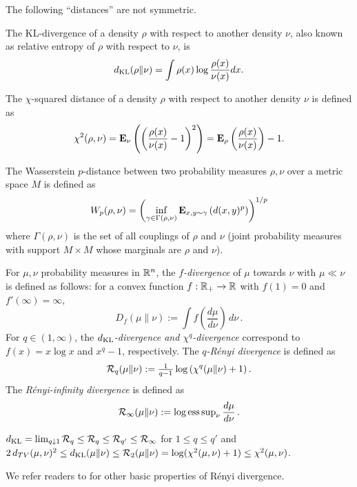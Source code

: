 The following ``distances'' are not symmetric.
\begin{defn}
\label{defn:KL-divergence}The KL-divergence of a density $\rho$
with respect to another density $\nu$, also known as relative entropy
of $\rho$ with respect to $\nu$, is 
\[
d_{\mathrm{KL}}(\rho\|\nu)=\int\rho(x)\log\frac{\rho(x)}{\nu(x)}dx.
\]
\end{defn}

\begin{defn}
The $\chi$-squared distance of a density $\rho$ with respect to
another density $\nu$ is defined as  
\[
\chi^{2}(\rho,\nu)=\mathbf{E}_{\nu}\left(\left(\frac{\rho(x)}{\nu(x)}-1\right)^{2}\right)=\mathbf{E}_{\rho}\left(\frac{\rho(x)}{\nu(x)}\right)-1.
\]
\end{defn}

\begin{defn}
\label{defn:The-Wasserstein--distance}The Wasserstein $p$-distance
between two probability measures $\rho,\nu$ over a metric space $M$
is defined as 
\[
W_{p}(\rho,\nu)=\left(\inf_{\gamma\in\Gamma(\rho,\nu)}\mathbf{E}_{x,y\sim\gamma}\left(d(x,y)^{p}\right)\right)^{1/p}
\]
where $\Gamma(\rho,\nu)$ is the set of all couplings of $\rho$ and
$\nu$ (joint probability measures with support $M\times M$ whose
marginals are $\rho$ and $\nu$).
\end{defn}

\begin{defn}
\label{def:p-dist} For $\mu,\nu$ probability measures in $\mathbb{R}^{n}$,
the \emph{$f$-divergence} of $\mu$ towards $\nu$ with $\mu\ll\nu$
is defined as follows: for a convex function $f:\mathbb{R}_{+}\to\mathbb{R}$ with
$f(1)=0$ and $f'(\infty)=\infty$, 
\[
D_{f}(\mu\|\nu):=\int f\left(\frac{d\mu}{d\nu}\right)\,d\nu\,.
\]
For $q\in(1,\infty)$, the \emph{$d_{\mathrm{KL}}$-divergence and $\chi^{q}$-divergence}
correspond to $f(x)=x\log x$ and $x^{q}-1$, respectively. The \emph{$q$-R\'enyi
divergence} is defined as 
\[
\mathbb{{\cal R}}_{q}(\mu\|\nu):=\tfrac{1}{q-1}\log\left(\chi^{q}(\mu\|\nu)+1\right).
\]
The \emph{R\'enyi-infinity divergence} is defined as
\[
\mathbb{{\cal R}}_{\infty}(\mu\|\nu):=\log\operatorname{ess\,sup}_{\nu}\frac{d\mu}{d\nu}\,.
\]
\end{defn}

\begin{fact}
$d_{\mathrm{KL}}=\lim_{q\downarrow1}\mathbb{{\cal R}}_{q}\leq\mathbb{{\cal R}}_{q}\leq\mathbb{{\cal R}}_{q'}\leq\mathbb{{\cal R}}_{\infty}$
for $1\leq q\leq q'$ and $2\,d_{TV}(\mu,\nu)^{2}\leq d_{\mathrm{KL}}(\mu\|\nu)\leq\mathbb{{\cal R}}_{2}(\mu\|\nu)=\log(\chi^{2}(\mu,\nu)+1)\leq\chi^{2}(\mu,\nu)$. 
\end{fact}

We refer readers to \cite{van2014renyi} for other basic properties
of R\'enyi divergence.

